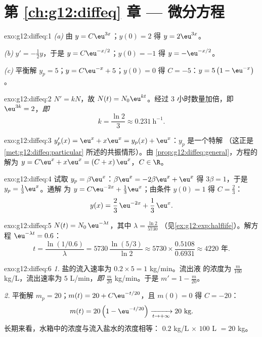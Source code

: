 \section*{第 \ref{ch:g12:diffeq} 章 --- 微分方程}

\begin{solution}{exo:g12:diffeq:1}
\emph{(a)} 由 $y = C\eu^{3x}$；$y(0) = 2$ 得 $y = 2\eu^{3x}$。

\emph{(b)} $y' = -\frac12 y$，于是 $y = C\eu^{-x/2}$；$y(0) = -1$ 得
$y = -\eu^{-x/2}$。

\emph{(c)} 平衡解 $y_p = 5$；$y = C\eu^{-x} + 5$；$y(0) = 0$ 得
$C = -5$：$y = 5\left(1 - \eu^{-x}\right)$。
\end{solution}

\begin{solution}{exo:g12:diffeq:2}
$N' = kN$，故 $N(t) = N_0 \eu^{kt}$。经过 $3$ 小时数量加倍，即
$\eu^{3k} = 2$，\emph{即}
\[
k = \frac{\ln 2}{3} \approx 0.231\ \text{h}^{-1}.
\]
\end{solution}

\begin{solution}{exo:g12:diffeq:3}
$y_p'(x) = \eu^x + x\eu^x = y_p(x) + \eu^x$：$y_p$ 是一个特解
（这正是 \cref{met:g12:diffeq:particular} 所述的共振情形）。由
\cref{prop:g12:diffeq:general}，方程的解为
$y = C\eu^{x} + x\eu^{x} = (C + x)\,\eu^x$，$C \in \R$。
\end{solution}

\begin{solution}{exo:g12:diffeq:4}
试取 $y_p = \beta\eu^x$：$\beta\eu^x = -2\beta\eu^x + \eu^x$ 得
$3\beta = 1$，于是 $y_p = \frac13\eu^x$。通解
为 $y = C\eu^{-2x} + \frac13\eu^{x}$；由条件 $y(0) = 1$ 得
$C = \frac23$：
\[
y(x) = \frac{2}{3}\,\eu^{-2x} + \frac{1}{3}\,\eu^{x}.
\]
\end{solution}

\begin{solution}{exo:g12:diffeq:5}
$N(t) = N_0\,\eu^{-\lambda t}$，其中 $\lambda = \frac{\ln 2}{5730}$
（见\cref{ex:g12:exp:halflife}）。解方程 $\eu^{-\lambda t} = 0.6$：
\[
t = \frac{\ln(1/0.6)}{\lambda} = 5730\,\frac{\ln(5/3)}{\ln 2}
\approx 5730 \times \frac{0.5108}{0.6931} \approx 4220 \text{ 年}.
\]
\end{solution}

\begin{solution}{exo:g12:diffeq:6}
\emph{1.} 盐的流入速率为 $0.2 \times 5 = 1$ kg/min。流出液
的浓度为 $\frac{m}{100}$ kg/L，流出速率为 $5$ L/min，\emph{即} $\frac{m}{20}$
kg/min。于是 $m' = 1 - \frac{m}{20}$。

\emph{2.} 平衡解 $m_p = 20$；$m(t) = 20 + C\eu^{-t/20}$，且
$m(0) = 0$ 得 $C = -20$：
\[
m(t) = 20\left(1 - \eu^{-t/20}\right) \xrightarrow[t\to+\infty]{} 20 \text{ kg}.
\]
长期来看，水箱中的浓度与流入盐水的浓度相等：
$0.2$ kg/L $\times$ $100$ L $= 20$ kg。
\end{solution}

